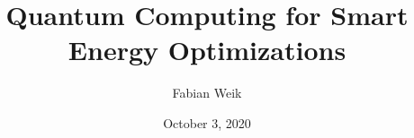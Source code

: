 \documentclass{article}
\author{Fabian Weik}
\date{October 3, 2020}
\title{Quantum Computing for Smart Energy Optimizations}
\begin{document}
  \maketitle

  
  
  

  \begin{appendices}
    
  \end{appendices}


  
  
\end{document}
